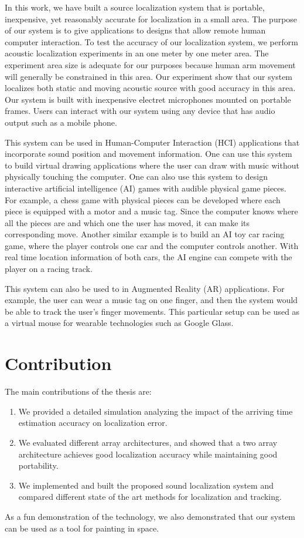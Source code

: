In this work, we have built a source localization system that is portable, inexpensive, yet reasonably accurate for localization in a small area. The purpose of our system is to give applications to designs that allow remote human computer interaction. To test the accuracy of our localization system, we perform acoustic localization experiments in an one meter by one meter area. The experiment area size is adequate for our purposes because human arm movement will generally be constrained in this area. Our experiment show that our system localizes both static and moving acoustic source with good accuracy in this area. Our system is built with inexpensive electret microphones mounted on portable frames. Users can interact with our system using any device that has audio output such as a mobile phone.

This system can be used in Human-Computer Interaction (HCI) applications that incorporate sound position and movement information. One can use this system to build virtual drawing applications where the user can draw with music without physically touching the computer. One can also use this system to design interactive artificial intelligence (AI) games with audible physical game pieces. For example, a chess game with physical pieces can be developed where each piece is equipped with a motor and a music tag. Since the computer knows where all the pieces are and which one the user has moved, it can make its corresponding move. Another similar example is to build an AI toy car racing game, where the player controls one car and the computer controls another. With real time location information of both cars, the AI engine can compete with the player on a racing track. 

This system can also be used to in Augmented Reality (AR) applications. For example, the user can wear a music tag on one finger, and then the system would be able to track the user's finger movements. This particular setup can be used as a virtual mouse for wearable technologies such as Google Glass. 


\section{Contribution}
The main contributions of the thesis are:
\begin{enumerate}
\item We provided a detailed simulation analyzing the impact of the arriving time estimation accuracy on localization error. 
\item We evaluated different array architectures, and showed that a two array architecture achieves good localization accuracy while maintaining good portability. 
\item We implemented and built the proposed sound localization system and compared different state of the art methods for localization and tracking. 
\end{enumerate}
As a fun demonstration of the technology, we also demonstrated that our system can be used as a tool for painting in space.

